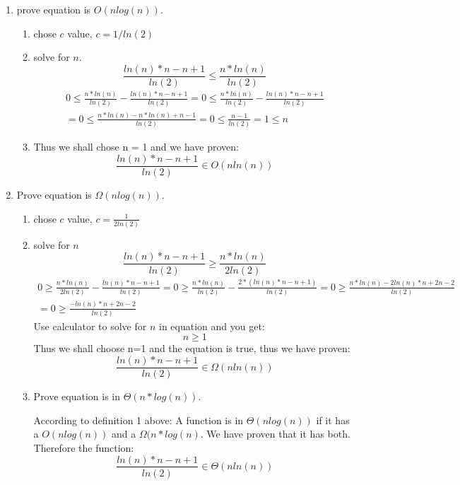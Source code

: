\documentclass[10pt,a4paper]{article}
\theoremstyle{definition}
\begin{document}
\begin{enumerate}
  \item prove equation is $O(n log(n))$.\\
  \begin{enumerate}
    \item chose $c$ value, $c = 1/ln(2)$
    \item solve for $n$.
    \begin{equation*}
      \frac{ln(n)*n-n+1}{ln(2)} \leq \frac{n*ln(n)}{ln(2)}
    \end{equation*}
    \begin{multline*}
      0 \leq \frac{n*ln(n)}{ln(2)} - \frac{ln(n)*n-n+1}{ln(2)} = 0 \leq \frac{n*ln(n)}{ln(2)} - \frac{ln(n)*n-n+1}{ln(2)} \\ = 0 \leq \frac{n*ln(n) - n*ln(n)+n-1}{ln(2)}= 0  \leq \frac{n-1}{ln(2)} =  1 \leq n
    \end{multline*}
    \item Thus we shall chose n = 1 and we have proven:
    \begin{equation*}
       \frac{ln(n)*n-n+1}{ln(2)} \in O(nln(n))
    \end{equation*}
  \end{enumerate}
  \item Prove equation is $\Omega(n log(n))$.
  \begin{enumerate}
    \item chose $c$ value, $c = \frac{1}{2ln(2)}$
    \item solve for $n$
    \begin{equation*}
      \frac{ln(n)*n-n+1}{ln(2)} \geq \frac{n*ln(n)}{2ln(2)}
    \end{equation*}
    \begin{multline*}
      0 \geq \frac{n*ln(n)}{2ln(2)} - \frac{ln(n)*n-n+1}{ln(2)} = 0 \geq \frac{n*ln(n)}{ln(2)} - \frac{2*(ln(n)*n-n+1)}{ln(2)} = 0 \geq \frac{n*ln(n)-2ln(n)*n+2n-2}{ln(2)} \\ = 0 \geq \frac{-ln(n)*n+2n-2}{ln(2)}
    \end{multline*}
    Use calculator to solve for $n$ in equation and you get:
    \begin{equation*}
      n \geq 1
    \end{equation*}
    Thus we shall choose n=1 and the equation is true, thus we have proven:
    \begin{equation}
       \frac{ln(n)*n-n+1}{ln(2)} \in \Omega(nln(n))
    \end{equation}
    \item Prove equation is in $\Theta(n*log(n))$.

    According to definition 1 above: A function is in $\Theta(nlog(n))$ if it has a $O(nlog(n))$ and a $\Omega(n*log(n)$. We have proven that it has both. Therefore the function:
    \begin{equation*}
       \frac{ln(n)*n-n+1}{ln(2)} \in \Theta(nln(n))
    \end{equation*}
  \end{enumerate}
\end{enumerate}
\end{document}
